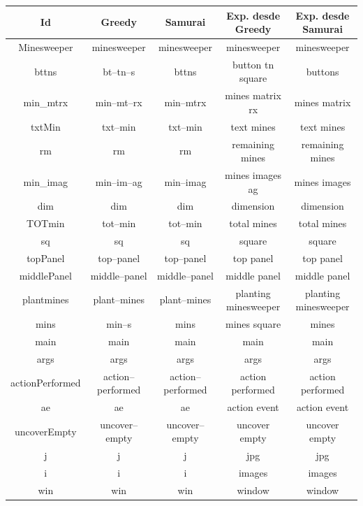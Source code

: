 \begin{table}

		\centering
   		\begin{tabular}{| c | c | c | c | c |}     
   		
       \hline
  	   \textbf{Id} & \textbf{Greedy} & \textbf{Samurai} & \textbf{Exp. desde Greedy} & \textbf{Exp. desde Samurai} \\ \hline
Minesweeper&minesweeper&minesweeper&minesweeper&minesweeper\\ \hline
bttns&bt--tn--s&bttns&button tn square&buttons\\ \hline
min\_mtrx&min--mt--rx&min--mtrx&mines matrix rx&mines matrix\\ \hline
txtMin&txt--min&txt--min&text mines&text mines\\ \hline
rm&rm&rm&remaining mines&remaining mines\\ \hline
min\_imag&min--im--ag&min--imag&mines images ag&mines images\\ \hline
dim&dim&dim&dimension&dimension\\ \hline
TOTmin&tot--min&tot--min&total mines&total mines\\ \hline
sq&sq&sq&square&square\\ \hline
topPanel&top--panel&top--panel&top panel&top panel\\ \hline
middlePanel&middle--panel&middle--panel&middle panel&middle panel\\ \hline
plantmines&plant--mines&plant--mines&planting minesweeper&planting minesweeper\\ \hline
mins&min--s&mins&mines square&mines\\ \hline
main&main&main&main&main\\ \hline
args&args&args&args&args\\ \hline
actionPerformed&action--performed&action--performed&action performed&action performed\\ \hline
ae&ae&ae&action event&action event\\ \hline
uncoverEmpty&uncover--empty&uncover--empty&uncover empty&uncover empty\\ \hline
j&j&j&jpg&jpg\\ \hline
i&i&i&images&images\\ \hline
win&win&win&window&window\\ \hline

\end{tabular}
\end{table}
